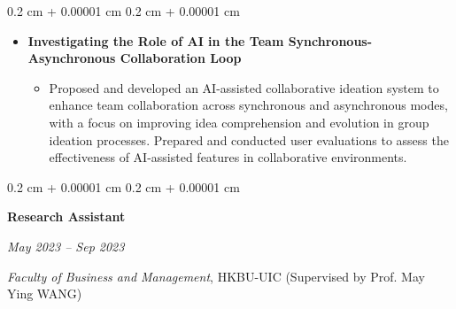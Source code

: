 \documentclass[10pt, letterpaper]{article}
\newenvironment{highlights}{
    \begin{itemize}[
        topsep=0.10 cm,
        parsep=0.10 cm,
        partopsep=0pt,
        itemsep=0pt,
        leftmargin=0.4 cm + 10pt
    ]
}{
    \end{itemize}
} %
\newenvironment{onecolentry}{
    \begin{adjustwidth}{
        0.2 cm + 0.00001 cm
    }{
        0.2 cm + 0.00001 cm
    }
}{
    \end{adjustwidth}
} %
\newenvironment{twocolentry}[2][]{
    \onecolentry
    \def\secondColumn{#2}
    \setcolumnwidth{\fill, 4.5 cm}
    \begin{paracol}{2}
}{
    \switchcolumn \raggedleft \secondColumn
    \end{paracol}
    \endonecolentry
} %
\begin{document}
\begin{onecolentry}
\begin{highlights}
                \item \textbf{Investigating the Role of AI in the Team Synchronous-Asynchronous Collaboration Loop}
                \begin{itemize}
                    \item Proposed and developed an AI-assisted collaborative ideation system to enhance team collaboration across synchronous and asynchronous modes, with a focus on improving idea comprehension and evolution in group ideation processes. Prepared and conducted user evaluations to assess the effectiveness of AI-assisted features in collaborative environments.
                \end{itemize}
            \end{highlights}
        \end{onecolentry}





        \begin{twocolentry}{
            \textit{May 2023 – Sep 2023}}
                \textbf{Research Assistant}   
        \end{twocolentry}
        \hspace{0.2cm}\textit{Faculty of Business and Management}, HKBU-UIC (Supervised by Prof. May Ying WANG)
\end{document}
